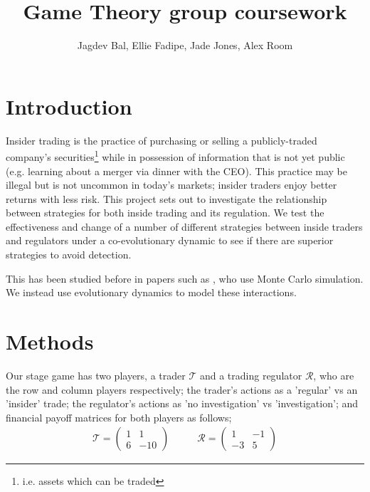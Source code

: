 \documentclass{article}
\title{Game Theory group coursework}
\author{Jagdev Bal, Ellie Fadipe, Jade Jones, Alex Room}
\date{}
\begin{document}
\maketitle

\section{Introduction}
Insider trading is the practice of purchasing or selling a publicly-traded company’s securities\footnote{i.e. assets which can be traded} while in possession of information that is not yet public (e.g. learning about a merger via dinner with the CEO). This practice may be illegal but is not uncommon in today's markets; insider traders enjoy better returns with less risk. This project sets out to investigate the relationship between strategies for both inside trading and its regulation. We test the effectiveness and change of a number of different strategies between inside traders and regulators under a co-evolutionary dynamic to see if there are superior strategies to avoid detection. 

This has been studied before in papers such as \citet{smales2017game}, who use Monte Carlo simulation. We instead use evolutionary dynamics to model these interactions.

\section{Methods}
Our stage game has two players, a trader $\mathcal{T}$ and a trading regulator $\mathcal{R}$, who are the row and column players respectively; the trader's actions as a 'regular' vs an 'insider' trade; the regulator's actions as 'no investigation' vs 'investigation'; and financial payoff matrices for both players as follows;
\begin{equation*}
\begin{split}
    \mathcal{T} = 
    \begin{pmatrix}
    1 & 1 \\
    6 & -10
    \end{pmatrix}
\end{split}
\quad\quad
\begin{split}
    \mathcal{R} = 
    \begin{pmatrix}
    1 & -1 \\
    -3 & 5
    \end{pmatrix}
\end{split}
\end{equation*}
\end{document}
